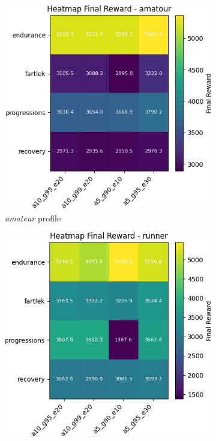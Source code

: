 \begin{figure}
    \centering
    \begin{subfigure}[t]{0.32\textwidth}
        \centering
        \includegraphics[width=\textwidth]{images/heatmap_final_amatour_1000.png}
      \caption{\textit{amateur} profile }
    \label{fig:amateur-1000}
    \end{subfigure}
    \begin{subfigure}[t]{0.32\textwidth}
        \centering
        \includegraphics[width=\textwidth]{images/heatmap_final_runner_1000.png}

\end{subfigure}
\end{figure}

